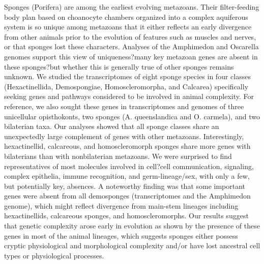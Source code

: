 \documentclass[a4paper, 11pt]{article}
\begin{document}
Sponges (Porifera) are among the earliest evolving metazoans. Their filter-feeding body plan based on choanocyte chambers organized into a complex aquiferous system is so unique among metazoans that it either reflects an early divergence from other animals prior to the evolution of features such as muscles and nerves, or that sponges lost these characters. Analyses of the Amphimedon and Oscarella genomes support this view of uniqueness?many key metazoan genes are absent in these sponges?but whether this is generally true of other sponges remains unknown. We studied the transcriptomes of eight sponge species in four classes (Hexactinellida, Demospongiae, Homoscleromorpha, and Calcarea) specifically seeking genes and pathways considered to be involved in animal complexity. For reference, we also sought these genes in transcriptomes and genomes of three unicellular opisthokonts, two sponges (A. queenslandica and O. carmela), and two bilaterian taxa. Our analyses showed that all sponge classes share an unexpectedly large complement of genes with other metazoans. Interestingly, hexactinellid, calcareous, and homoscleromorph sponges share more genes with bilaterians than with nonbilaterian metazoans. We were surprised to find representatives of most molecules involved in cell?cell communication, signaling, complex epithelia, immune recognition, and germ-lineage/sex, with only a few, but potentially key, absences. A noteworthy finding was that some important genes were absent from all demosponges (transcriptomes and the Amphimedon genome), which might reflect divergence from main-stem lineages including hexactinellids, calcareous sponges, and homoscleromorphs. Our results suggest that genetic complexity arose early in evolution as shown by the presence of these genes in most of the animal lineages, which suggests sponges either possess cryptic physiological and morphological complexity and/or have lost ancestral cell types or physiological processes.
\end{document}
